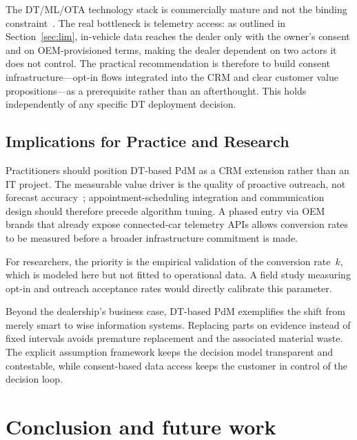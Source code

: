 \documentclass[conference,a4paper]{IEEEtran}
\begin{document}
The DT/ML/OTA technology stack is commercially mature and not the binding
constraint~\cite{lopes2025vehicledt,abougrad2026xai}. The real bottleneck is
telemetry access: as outlined in Section~\ref{sec:lim}, in-vehicle data
reaches the dealer only with the owner's consent and on OEM-provisioned
terms, making the dealer dependent on two actors it does not control. The practical recommendation is therefore to build consent infrastructure---opt-in
flows integrated into the CRM and clear customer value propositions---as a
prerequisite rather than an afterthought. This holds independently of
any specific DT deployment decision.

\subsection{Implications for Practice and Research}

Practitioners should position DT-based PdM as a CRM extension rather than an
IT project. The measurable value driver is the quality of proactive outreach,
not forecast accuracy~\cite{challagalla_proactive_2009,gonzalez-pridaDigitalTransformationAftersales2025};
appointment-scheduling integration and communication design should therefore
precede algorithm tuning. A phased entry via OEM brands that already expose
connected-car telemetry APIs allows conversion rates to be measured before a
broader infrastructure commitment is made.

For researchers, the priority is the empirical validation of the conversion
rate~$k$, which is modeled here but not fitted to operational data. A field
study measuring opt-in and outreach acceptance rates would directly calibrate
this parameter.

Beyond the dealership's business case, DT-based PdM exemplifies the shift
from merely smart to wise information systems. Replacing parts on evidence
instead of fixed intervals avoids premature replacement and the
associated material waste. The explicit assumption framework keeps the decision model transparent and
contestable, while consent-based data access keeps the customer in control of
the decision loop.


\section{Conclusion and future work}
\end{document}
